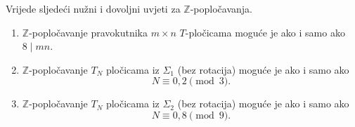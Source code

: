 \documentclass[11pt]{scrartcl}
\begin{document}
\begin{teorem} Vrijede sljedeći nužni i dovoljni uvjeti za $\mathbb{Z}$-popločavanja.
\begin{enumerate}
\item $\mathbb{Z}$-popločavanje pravokutnika $m \times n$ $T$-pločicama moguće je ako i samo ako $8 \mid mn$.
\item $\mathbb{Z}$-popločavanje $T_N$ pločicama iz $\Sigma_1$ (bez rotacija) moguće je ako i samo ako
\[N \equiv 0,2 \pmod{3}.\]
\item $\mathbb{Z}$-popločavanje $T_N$ pločicama iz $\Sigma_2$ (bez rotacija) moguće je ako i samo ako
\[N \equiv 0,8 \pmod{9}.\]
\end{enumerate}
\end{teorem}





\printbibliography
\end{document}
